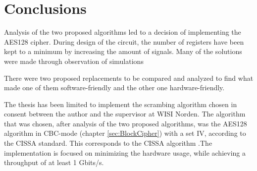 
\section{Conclusions}
Analysis of the two proposed algorithms led to a decision of 
implementing the AES128 cipher. During design of the circuit, the 
number of registers have been kept to a minimum by increasing the 
amount of signals. Many of the solutions were made through observation 
of simulations 

There were two proposed replacements to be compared and analyzed 
to find what made one of them software-friendly and the other one 
hardware-friendly. 

The thesis has been limited to implement the scrambing algorithm 
chosen in consent between the author and the supervisor at WISI 
Norden. The algorithm that was chosen, after analysis of the two 
proposed algorithms, was the AES128 algorithm in CBC-mode (chapter 
\ref{sec:BlockCipher}) with a set IV, according to the CISSA standard. 
This corresponds to the CISSA algorithm \citep{DVB:2013}.The 
implementation is focused on minimizing the hardware usage, while 
achieving a throughput of at least 1 Gbits/s.

